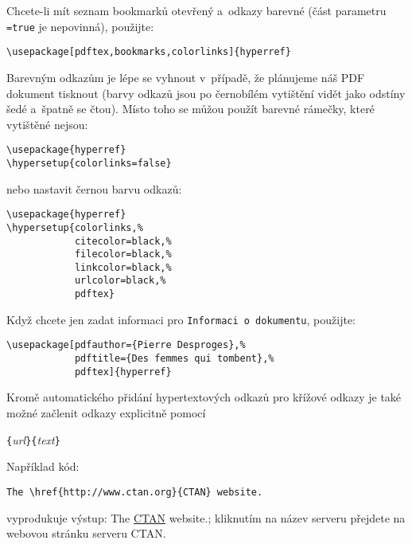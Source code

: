 Chcete-li mít seznam bookmarků otevřený a~odkazy barevné
(část parametru \texttt{=true} je nepovinná), použijte:
\begin{code}
\begin{verbatim}
\usepackage[pdftex,bookmarks,colorlinks]{hyperref}
\end{verbatim}
\end{code}

Barevným odkazům je lépe se vyhnout v~případě, že plánujeme náš PDF dokument
tisknout (barvy odkazů jsou po černobílém vytištění vidět jako
odstíny šedé a~špatně se čtou). Místo toho se můžou použít
barevné rámečky, které vytištěné nejsou:
\begin{code}
\begin{verbatim}
\usepackage{hyperref}
\hypersetup{colorlinks=false}
\end{verbatim}
\end{code}
\noindent nebo nastavit černou barvu odkazů:
\begin{code}
\begin{verbatim}
\usepackage{hyperref}
\hypersetup{colorlinks,%
            citecolor=black,%
            filecolor=black,%
            linkcolor=black,%
            urlcolor=black,%
            pdftex}
\end{verbatim}
\end{code}

Když chcete jen zadat informaci pro \texttt{Informaci o~dokumentu},
použijte:
\begin{code}
\begin{verbatim}
\usepackage[pdfauthor={Pierre Desproges},%
            pdftitle={Des femmes qui tombent},%
            pdftex]{hyperref}
\end{verbatim}
\end{code}

\vspace{\baselineskip}

Kromě automatického přidání hypertextových odkazů pro křížové odkazy je také
možné začlenit odkazy explicitně pomocí
\begin{lscommand}
\verb|{|\emph{url}\verb|}{|\emph{text}\verb|}|
\end{lscommand}

\newpage
Například kód:
\begin{code}
\begin{verbatim}
The \href{http://www.ctan.org}{CTAN} website.
\end{verbatim}
\end{code}
vyprodukuje výstup: The \href{http://www.ctan.org}{CTAN} website.;
kliknutím na název serveru přejdete na webovou stránku serveru CTAN.

